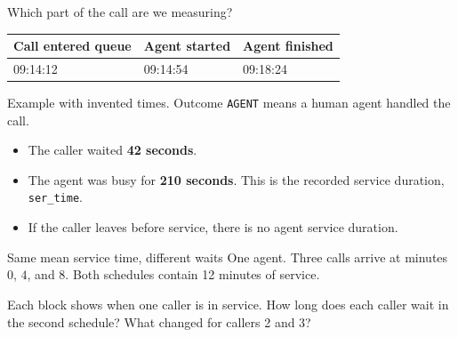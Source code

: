 \documentclass{beamer}
\begin{document}
\begin{frame}{Which part of the call are we measuring?}
  \begin{center}
    \begin{tabular}{@{}lll@{}}
      \toprule
      Call entered queue & Agent started & Agent finished\\
      \midrule
      09:14:12 & 09:14:54 & 09:18:24\\
      \bottomrule
    \end{tabular}
  \end{center}
  \small Example with invented times. Outcome \texttt{AGENT} means a human
  agent handled the call.\normalsize

  \vspace{0.65em}
  \begin{itemize}
    \item The caller waited \textbf{42 seconds}.
    \item The agent was busy for \textbf{210 seconds}. This is the recorded service duration,
      \texttt{ser\_time}.
    \item If the caller leaves before service, there is no agent service duration.
  \end{itemize}
\end{frame}

\begin{frame}{Same mean service time, different waits}
  One agent. Three calls arrive at minutes $0$, $4$, and $8$.
  Both schedules contain 12 minutes of service.

  \vspace{0.7em}
  \centering

  \vspace{0.5em}
  \raggedright
  Each block shows when one caller is in service. How long does each
  caller wait in the second schedule? What changed for callers 2 and 3?
\end{frame}
\end{document}
